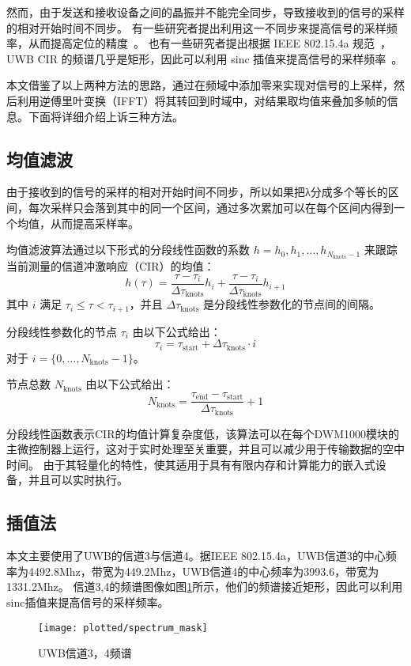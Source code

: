 然而，由于发送和接收设备之间的晶振并不能完全同步，导致接收到的信号的采样的相对开始时间不同步。
有一些研究者提出利用这一不同步来提高信号的采样频率，从而提高定位的精度~\cite{Ledergerber}。
也有一些研究者提出根据 IEEE 802.15.4a 规范~\cite{IEEE_Std_802.15.4a}， UWB CIR 的频谱几乎是矩形，因此可以利用 sinc 插值来提高信号的采样频率~\cite{MAMPI}。

本文借鉴了以上两种方法的思路，通过在频域中添加零来实现对信号的上采样，然后利用逆傅里叶变换（IFFT）将其转回到时域中，对结果取均值来叠加多帧的信息。下面将详细介绍上诉三种方法。

\subsection{均值滤波}
由于接收到的信号的采样的相对开始时间不同步，所以如果把λ分成多个等长的区间，每次采样只会落到其中的同一个区间，通过多次累加可以在每个区间内得到一个均值，从而提高采样率。

均值滤波算法通过以下形式的分段线性函数的系数 \( h = h_0 , h_1 , \ldots , h_{N_{\text{knots}} -1} \) 来跟踪当前测量的信道冲激响应（CIR）的均值：
\[ h(\tau ) = \frac{\tau  - \tau_i}{\Delta \tau_{\text{knots}}} h_i + \frac{\tau  - \tau_i}{\Delta \tau_{\text{knots}}} h_{i +1} \]
其中 \( i \) 满足 \( \tau_i \leq \tau < \tau_{i+1} \)，并且 \( \Delta \tau_{\text{knots}} \) 是分段线性参数化的节点间的间隔。

分段线性参数化的节点 \( \tau_i \) 由以下公式给出：
\[ \tau_i = \tau_{\text{start}} + \Delta \tau_{\text{knots}} \cdot i \]
对于 \( i = \{0, \ldots , N_{\text{knots}} - 1\} \)。

节点总数 \( N_{\text{knots}} \) 由以下公式给出：
\[ N_{\text{knots}} = \frac{\tau_{\text{end}} - \tau_{\text{start}}}{\Delta \tau_{\text{knots}}} + 1 \]

分段线性函数表示CIR的均值计算复杂度低，该算法可以在每个DWM1000模块的主微控制器上运行，这对于实时处理至关重要，并且可以减少用于传输数据的空中时间。
由于其轻量化的特性，使其适用于具有有限内存和计算能力的嵌入式设备，并且可以实时执行。

\subsection{插值法}
本文主要使用了UWB的信道3与信道4。据IEEE 802.15.4a，UWB信道3的中心频率为4492.8Mhz，带宽为449.2Mhz，UWB信道4的中心频率为3993.6，带宽为1331.2Mhz。
信道3,4的频谱图像如图\ref{fig:spectrum_mask}所示，他们的频谱接近矩形，因此可以利用sinc插值来提高信号的采样频率。
\begin{figure}[htbp]
    \centering
    \texttt{[image: plotted/spectrum\_mask]}
    \caption{\label{fig:spectrum_mask}UWB信道3，4频谱}
\end{figure}

